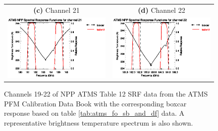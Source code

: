 \begin{figure}[H]
\begin{tabular}{c c}
    \textsf{\textbf{(c)} Channel 21} &
    \textsf{\textbf{(d)} Channel 22} \\
    \includegraphics[bb=70 400 300 559,clip,scale=1.0]{graphics/srf/table12/atms_npp.ch21.osrf.eps} &
    \includegraphics[bb=70 400 300 559,clip,scale=1.0]{graphics/srf/table12/atms_npp.ch22.osrf.eps}
  \end{tabular}
  \caption{Channels 19-22 of NPP ATMS Table 12 SRF data from the ATMS PFM Calibration Data Book\cite{ATMS_PFM_CalLog} with the corresponding boxcar response based on table \ref{tab:atms_fo_sb_and_df} data. A representative brightness temperature spectrum is also shown.}
  \label{fig:atms_npp.table12.ch19-22.osrf}
\end{figure}
